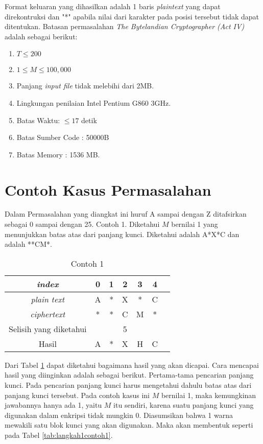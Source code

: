 	
	Format keluaran yang dihasilkan adalah 1 baris \textit{plaintext} yang dapat direkontruksi dan "*" apabila nilai dari karakter pada posisi tersebut tidak dapat ditentukan. 
	Batasan permasalahan \textit{The Bytelandian Cryptographer (Act IV)} adalah sebagai berikut:
	\begin{enumerate}
		\item $T \leq 200$
		\item $1 \leq M \leq 100,000$
		\item Panjang \textit{input file} tidak melebihi dari 2MB.
		\item Lingkungan penilaian Intel Pentium G860 3GHz.
		\item Batas Waktu: $\leq17$ detik
		\item Batas Sumber Code : 50000B
		\item Batas Memory : 1536 MB.                 
	\end{enumerate}

	\section{Contoh Kasus Permasalahan}
	Dalam Permasalahan yang diangkat ini huruf A sampai dengan Z ditafsirkan sebagai 0 sampai dengan 25.
	Contoh 1. Diketahui $M$ bernilai 1 yang menunjukkan batas atas dari panjang kunci. Diketahui \plaintext adalah A*X*C dan \ciphertext adalah **CM*. 
	\begin{table}[H]
	 	\centering
		\caption{Contoh 1}	 	
	 	\begin{tabular}{|c|c|c|c|c|c|c|}\hline
	 	\textit{index}&0&1&2&3&4\\ \hline
	 	\textit{plain text}&A&*&X&*&C\\ \hline
	 	\textit{ciphertext}&*&*&C&M&*\\ \hline
	 	Selisih yang diketahui& & &5& & \\ \hline
	 	Hasil              &A&*&X&H&C\\ \hline
	 	\end{tabular}
	 	\label{tab:contoh1}
	\end{table}
	 
	 Dari Tabel \ref{tab:contoh1} dapat diketahui bagaimana hasil yang akan dicapai. Cara mencapai hasil yang diinginkan adalah sebagai berikut. Pertama-tama pencarian panjang kunci. Pada pencarian panjang kunci harus mengetahui dahulu batas atas dari panjang kunci tersebut. Pada contoh kasus ini $M$ bernilai 1, maka kemungkinan jawabannya hanya ada 1, yaitu $M$ itu sendiri, karena suatu panjang kunci yang digunakan dalam enkripsi tidak mungkin 0. Diasumsikan bahwa 1 warna mewakili satu blok kunci yang akan digunakan. Maka akan membentuk seperti pada Tabel \ref{tab:langkah1contoh1}.
	 
